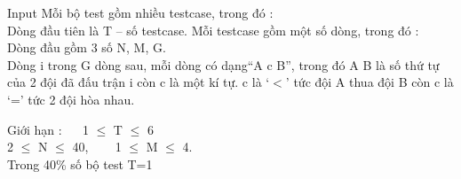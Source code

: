 Input
Mỗi bộ test gồm nhiều testcase, trong đó :   \textbf{
\\}   Dòng đầu tiên là T – số testcase. Mỗi testcase gồm một số dòng, trong đó :   
\\   Dòng đầu gồm 3 số N, M, G.   
\\   Dòng i trong G dòng sau, mỗi dòng có dạng“A c B”, trong đó A B là số thứ tự của 2 đội đã đấu trận i còn c là một kí tự. c là ‘$<$’ tức đội A thua đội B còn c là ‘=’ tức 2 đội hòa nhau.  

Giới hạn   :    1 $\le$  T  $\le$  6   
\\   2  $\le$  N  $\le$  40,     1  $\le$  M  $\le$  4.   
\\   Trong 40\% số bộ test T=1